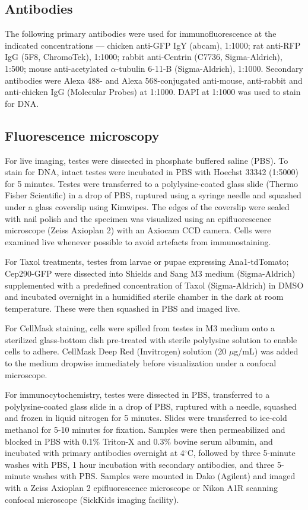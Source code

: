 \documentclass[12pt, twoside, letterpaper]{article}
\begin{document}
\begin{doublespacing}
\begin{linenumbers}
    \subsection*{Antibodies}
    The following primary antibodies were used for immunofluorescence
    at the indicated concentrations ---
    chicken anti-GFP IgY (abcam), 1:1000;
    rat anti-RFP IgG (5F8, ChromoTek), 1:1000;
    rabbit anti-Centrin (C7736, Sigma-Aldrich), 1:500;
    mouse anti-acetylated $\alpha$-tubulin 6-11-B (Sigma-Aldrich), 1:1000.
    Secondary antibodies were Alexa 488- and Alexa 568-conjugated
    anti-mouse, anti-rabbit and anti-chicken
    IgG (Molecular Probes) at 1:1000.
    DAPI at 1:1000 was used to stain for DNA. 

    \subsection*{Fluorescence microscopy}
    For live imaging, testes were dissected in phosphate buffered saline (PBS).
    To stain for DNA, intact testes were incubated in PBS with
    Hoechst 33342 (1:5000) for 5 minutes.
    Testes were transferred to a polylysine-coated glass slide (Thermo Fisher Scientific) in a drop of PBS,
    ruptured using a syringe needle and
    squashed under a glass coverslip using Kimwipes.
    The edges of the coverslip were sealed with nail polish
    and the specimen was visualized using an epifluorescence microscope (Zeiss Axioplan 2)
    with an Axiocam CCD camera.
    Cells were examined live whenever possible to avoid artefacts from immunostaining.

    For Taxol treatments, testes from larvae or pupae expressing
    Ana1-tdTomato; Cep290-GFP were
    dissected into Shields and Sang M3 medium (Sigma-Aldrich) supplemented
    with a predefined
    concentration of Taxol (Sigma-Aldrich) in DMSO
    and incubated overnight in a humidified sterile
    chamber in the dark at room temperature.
    These were then squashed in PBS and imaged live.

    For CellMask staining, cells were spilled from testes in M3 medium onto
    a sterilized glass-bottom dish pre-treated with sterile polylysine solution
    to enable cells to adhere.
    CellMask Deep Red (Invitrogen) solution (20 $\mu$g/mL) was added to the medium dropwise
    immediately before visualization under a confocal microscope.

    For immunocytochemistry, testes were dissected in PBS,
    transferred to a polylysine-coated glass slide in a drop of PBS,
    ruptured with a needle, squashed and frozen in liquid nitrogen for 5 minutes.
    Slides were transferred to ice-cold methanol for 5-10 minutes for fixation.
    Samples were then permeabilized and blocked in PBS with 0.1\% Triton-X and 0.3\% bovine
    serum albumin, and incubated with primary antibodies overnight at 4$^{\circ}$C,
    followed by three 5-minute washes with PBS, 1 hour incubation
    with secondary antibodies, and three 5-minute washes with PBS.
    Samples were mounted in Dako (Agilent) and imaged with
    a Zeiss Axioplan 2 epifluorescence microscope
    or Nikon A1R scanning confocal microscope (SickKids imaging facility).


\end{linenumbers}
\end{doublespacing}
\end{document}
